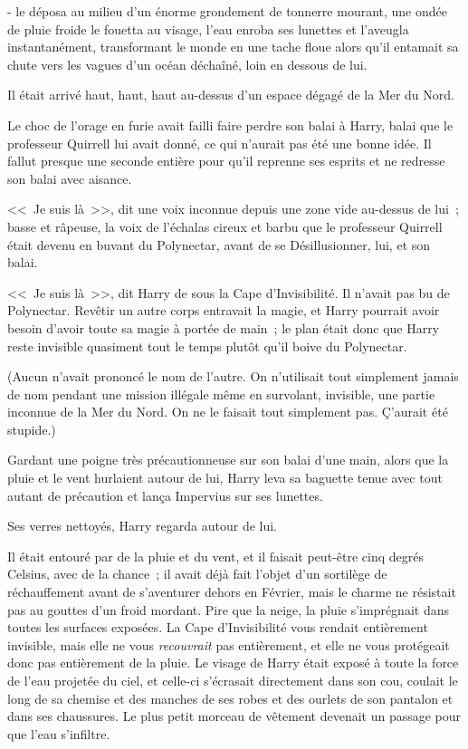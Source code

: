 - le déposa au milieu d'un énorme grondement de tonnerre mourant, une ondée de pluie froide le fouetta au visage, l'eau enroba ses lunettes et l'aveugla instantanément, transformant le monde en une tache floue alors qu'il entamait sa chute vers les vagues d'un océan déchaîné, loin en dessous de lui.

Il était arrivé haut, haut, haut au-dessus d'un espace dégagé de la Mer du Nord.

Le choc de l'orage en furie avait failli faire perdre son balai à Harry, balai que le professeur Quirrell lui avait donné, ce qui n'aurait pas été une bonne idée. Il fallut presque une seconde entière pour qu'il reprenne ses esprits et ne redresse son balai avec aisance.

<<~Je suis là~>>, dit une voix inconnue depuis une zone vide au-dessus de lui~; basse et râpeuse, la voix de l'échalas cireux et barbu que le professeur Quirrell était devenu en buvant du Polynectar, avant de se Désillusionner, lui, et son balai.

<<~Je suis là~>>, dit Harry de sous la Cape d'Invisibilité. Il n'avait pas bu de Polynectar. Revêtir un autre corps entravait la magie, et Harry pourrait avoir besoin d'avoir toute sa magie à portée de main~; le plan était donc que Harry reste invisible quasiment tout le temps plutôt qu'il boive du Polynectar.

(Aucun n'avait prononcé le nom de l'autre. On n'utilisait tout simplement jamais de nom pendant une mission illégale même en survolant, invisible, une partie inconnue de la Mer du Nord. On ne le faisait tout simplement pas. Ç'aurait été stupide.)

Gardant une poigne très précautionneuse sur son balai d'une main, alors que la pluie et le vent hurlaient autour de lui, Harry leva sa baguette tenue avec tout autant de précaution et lança Impervius sur ses lunettes.

Ses verres nettoyés, Harry regarda autour de lui.

Il était entouré par de la pluie et du vent, et il faisait peut-être cinq degrés Celsius, avec de la chance~; il avait déjà fait l'objet d'un sortilège de réchauffement avant de s'aventurer dehors en Février, mais le charme ne résistait pas au gouttes d'un froid mordant. Pire que la neige, la pluie s'imprégnait dans toutes les surfaces exposées. La Cape d'Invisibilité vous rendait entièrement invisible, mais elle ne vous \emph{recouvrait} pas entièrement, et elle ne vous protégeait donc pas entièrement de la pluie. Le visage de Harry était exposé à toute la force de l'eau projetée du ciel, et celle-ci s'écrasait directement dans son cou, coulait le long de sa chemise et des manches de ses robes et des ourlets de son pantalon et dans ses chaussures. Le plus petit morceau de vêtement devenait un passage pour que l'eau s'infiltre.

